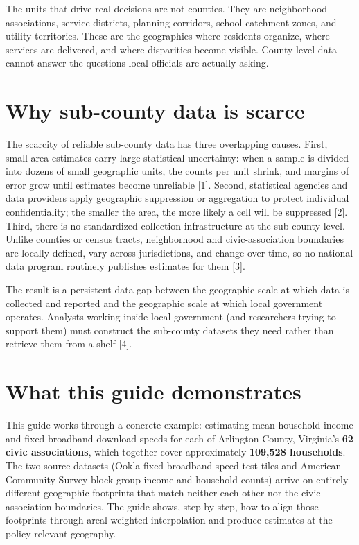 \documentclass[
  letterpaper,
  DIV=11,
  numbers=noendperiod]{scrreprt}
\begin{document}
The units that drive real decisions are not counties. They are
neighborhood associations, service districts, planning corridors, school
catchment zones, and utility territories. These are the geographies
where residents organize, where services are delivered, and where
disparities become visible. County-level data cannot answer the
questions local officials are actually asking.

\section{Why sub-county data is
scarce}\label{why-sub-county-data-is-scarce}

The scarcity of reliable sub-county data has three overlapping causes.
First, small-area estimates carry large statistical uncertainty: when a
sample is divided into dozens of small geographic units, the counts per
unit shrink, and margins of error grow until estimates become unreliable
{[}1{]}. Second, statistical agencies and data providers apply
geographic suppression or aggregation to protect individual
confidentiality; the smaller the area, the more likely a cell will be
suppressed {[}2{]}. Third, there is no standardized collection
infrastructure at the sub-county level. Unlike counties or census
tracts, neighborhood and civic-association boundaries are locally
defined, vary across jurisdictions, and change over time, so no national
data program routinely publishes estimates for them {[}3{]}.

The result is a persistent data gap between the geographic scale at
which data is collected and reported and the geographic scale at which
local government operates. Analysts working inside local government (and
researchers trying to support them) must construct the sub-county
datasets they need rather than retrieve them from a shelf {[}4{]}.

\section{What this guide
demonstrates}\label{what-this-guide-demonstrates}

This guide works through a concrete example: estimating mean household
income and fixed-broadband download speeds for each of Arlington County,
Virginia's \textbf{62 civic associations}, which together cover
approximately \textbf{109,528 households}. The two source datasets
(Ookla fixed-broadband speed-test tiles and American Community Survey
block-group income and household counts) arrive on entirely different
geographic footprints that match neither each other nor the
civic-association boundaries. The guide shows, step by step, how to
align those footprints through areal-weighted interpolation and produce
estimates at the policy-relevant geography.
\end{document}
